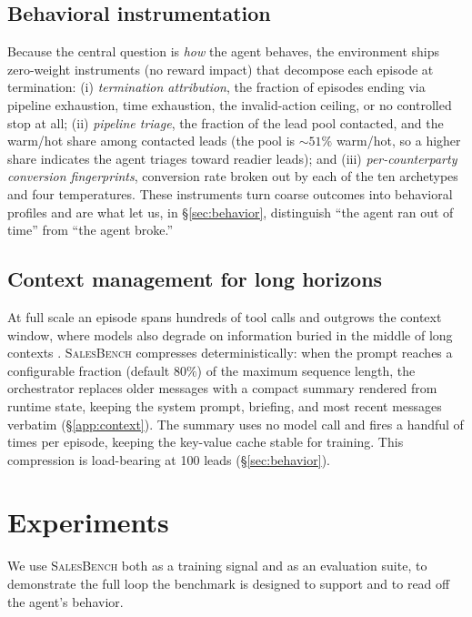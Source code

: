 \documentclass{article} %
\newcommand{\salesbench}{\textsc{SalesBench}}
\begin{document}
\subsection{Behavioral instrumentation}
\label{sec:instrumentation}
Because the central question is \emph{how} the agent behaves, the environment ships zero-weight instruments
(no reward impact) that decompose each episode at termination: (i) \emph{termination attribution}, the fraction
of episodes ending via pipeline exhaustion, time exhaustion, the invalid-action ceiling, or no controlled stop
at all; (ii) \emph{pipeline triage}, the fraction of the lead pool contacted, and the warm/hot share among
contacted leads (the pool is ${\sim}51\%$ warm/hot, so a higher share indicates the agent triages toward readier
leads); and (iii) \emph{per-counterparty conversion fingerprints}, conversion rate broken out by each of the ten
archetypes and four temperatures. These instruments turn coarse outcomes into behavioral profiles and are what
let us, in \S\ref{sec:behavior}, distinguish ``the agent ran out of time'' from ``the agent broke.''

\subsection{Context management for long horizons}
\label{sec:context}
At full scale an episode spans hundreds of tool calls and outgrows the context window, where models also degrade on
information buried in the middle of long contexts \citep{liu2024lostmiddle}. \salesbench{} compresses
deterministically: when the prompt reaches a configurable fraction (default $80\%$) of the maximum sequence
length, the orchestrator replaces older messages with a compact summary rendered from runtime state, keeping the
system prompt, briefing, and most recent messages verbatim (\S\ref{app:context}). The summary uses no model call
and fires a handful of times per episode, keeping the key-value cache stable for training. This compression is
load-bearing at 100 leads (\S\ref{sec:behavior}).

\section{Experiments}
\label{sec:experiments}
We use \salesbench{} both as a training signal and as an evaluation suite, to demonstrate the full loop the
benchmark is designed to support and to read off the agent's behavior.
\end{document}
